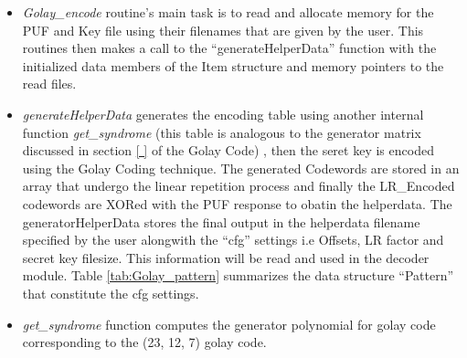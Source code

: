 \begin{itemize}
	\item \emph{Golay\_encode} routine's main task is to read and allocate memory for the PUF and Key file using their filenames that are given by the user. This routines then makes a call to the ``generateHelperData'' function with the initialized data members of the Item structure and memory pointers to the read files.
	\item \emph{generateHelperData} generates the encoding table using another internal function \emph{get\_syndrome} (this table is analogous to the generator matrix discussed in section \ref{ } of the Golay Code) , then the seret key is encoded using the Golay Coding technique. The generated Codewords are stored in an array that undergo the linear repetition process and finally the LR\_Encoded codewords are XORed with the PUF response to obatin the
		helperdata. The generatorHelperData stores the final output in the helperdata filename specified by the user alongwith the ``cfg'' settings i.e Offsets, LR factor and secret key filesize. This information will be read and used in the decoder module. Table \ref{tab:Golay_pattern} summarizes the data structure ``Pattern'' that constitute the cfg settings.

	\item \emph{get\_syndrome} function computes the generator polynomial for golay code corresponding to the (23, 12, 7) golay code. \end{itemize}

